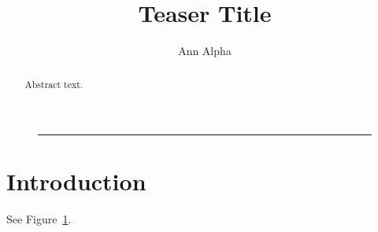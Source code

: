 \documentclass[twocolumn]{article}
\begin{document}
\title{Teaser Title}
\author{Ann Alpha}
\maketitle
\begin{figure}[h]
  \centering
  \begin{minipage}{.45\linewidth}
    \rule{2cm}{1cm}
    \label{fig:float}
  \end{minipage}
\end{figure}
\begin{abstract}
Abstract text.
\end{abstract}
\section{Introduction}
See Figure~\ref{fig:float}.
\clearpage
\end{document}
